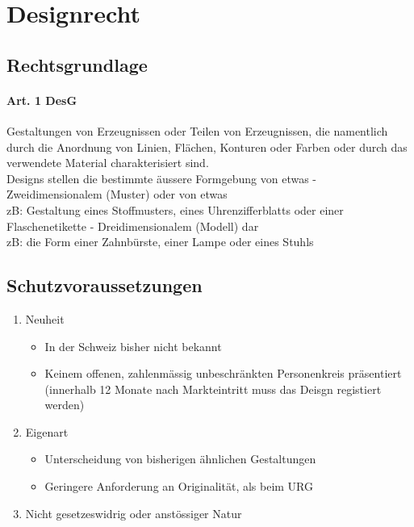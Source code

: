 \section{Designrecht}

\subsection{Rechtsgrundlage}

\paragraph{Art. 1 DesG}
Gestaltungen von Erzeugnissen oder Teilen von Erzeugnissen, die namentlich durch die Anordnung von Linien, Flächen, Konturen oder Farben oder durch das verwendete Material charakterisiert sind.\\

Designs stellen die bestimmte äussere Formgebung von etwas -
Zweidimensionalem (Muster) oder von etwas\\
zB: Gestaltung eines Stoffmusters, eines Uhrenzifferblatts oder einer
Flaschenetikette - Dreidimensionalem (Modell) dar\\
zB: die Form einer Zahnbürste, einer Lampe oder eines Stuhls


\subsection{Schutzvoraussetzungen}

\begin{enumerate}
	\tightlist
	\item Neuheit
	\begin{itemize}
		\tightlist
		\item In der Schweiz bisher nicht bekannt
		\item Keinem offenen, zahlenmässig unbeschränkten Personenkreis
		präsentiert (innerhalb 12 Monate nach Markteintritt muss das Deisgn
		registiert werden)
	\end{itemize}
	\item Eigenart
	\begin{itemize}
		\tightlist
		\item Unterscheidung von bisherigen ähnlichen Gestaltungen
		\item Geringere Anforderung an Originalität, als beim URG
	\end{itemize}
	\item Nicht gesetzeswidrig oder anstössiger Natur
\end{enumerate}

